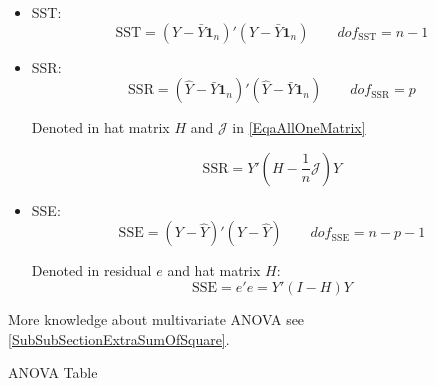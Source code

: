 \begin{itemize}[topsep=2pt,itemsep=2pt]
    \item SST:
    \begin{equation}
        \mathrm{SST}=(Y-\bar{Y}\mathbf{1}_n)'(Y-\bar{Y}\mathbf{1}_n)\qquad dof_{\mathrm{SST}}=n-1
    \end{equation}
    \item SSR:
    \begin{equation}
         \mathrm{SSR}=(\hat{Y}-\bar{Y}\mathbf{1}_n)'(\hat{Y}-\bar{Y}\mathbf{1}_n)\qquad dof_{\mathrm{SSR}}=p
    \end{equation}

    Denoted in hat matrix $ H $ and $ \mathcal{J} $ in \autoref{EqaAllOneMatrix}
    
    \begin{equation}\label{EqaSSMInMatrixNotation}
        \mathrm{SSR}=Y'(H-\dfrac{1}{n}\mathcal{J})Y 
    \end{equation}
    
    
    \item SSE:
    \begin{equation}
         \mathrm{SSE}=(Y-\hat{Y})'(Y-\hat{Y})\qquad dof_\mathrm{SSE}=n-p-1
    \end{equation}

    Denoted in residual $ e $ and hat matrix $ H $:
    \begin{equation}
        \mathrm{SSE}=e'e=Y'(I-H)Y 
    \end{equation}
    
    
    
\end{itemize}

More knowledge about multivariate ANOVA see \autoref{SubSubSectionExtraSumOfSquare}.






\begin{point}
    ANOVA Table
\end{point}

